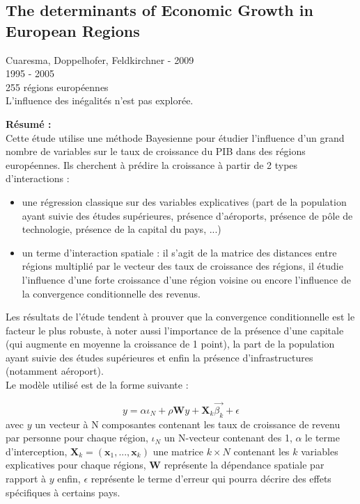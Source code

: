\documentclass[11pt,a4paper]{article}
\begin{document}
\subsection{The determinants of Economic Growth in European Regions}

Cuaresma, Doppelhofer, Feldkirchner - 2009 \\
1995 - 2005 \\
255 régions européennes \\
L'influence des inégalités n'est pas explorée. 

\noindent
\textbf{Résumé :} \\
Cette étude utilise une méthode Bayesienne pour étudier l'influence d'un grand nombre de variables sur le taux de croissance du PIB dans des régions européennes. Ils cherchent à prédire la croissance à partir de 2 types d'interactions :
\begin{itemize}
\item une régression classique sur des variables explicatives (part de la population ayant suivie des études supérieures, présence d'aéroports, présence de pôle de technologie, présence de la capital du pays, ...)
\item un terme d'interaction spatiale : il s'agit de la matrice des distances entre régions multiplié par le vecteur des taux de croissance des régions, il étudie l'influence d'une forte croissance d'une région voisine ou encore l'influence de la convergence conditionnelle des revenus. 
\end{itemize}
Les résultats de l'étude tendent à prouver que la convergence conditionnelle est le facteur le plus robuste, à noter aussi l'importance de la présence d'une capitale (qui augmente en moyenne la croissance de 1 point), la part de la population ayant suivie des études supérieures et enfin la présence d'infrastructures (notamment aéroport).\\

Le modèle utilisé est de la forme suivante : 

\begin{equation}
y = \alpha \iota_N + \rho \boldsymbol{W} y + \boldsymbol{X}_k \vec{\beta_k} + \epsilon
\end{equation}
avec $y$ un vecteur à N composantes contenant les taux de croissance de revenu par personne pour chaque région, $\iota_N$ un N-vecteur contenant des 1, $\alpha$ le terme d'interception, $\boldsymbol{X}_k = (\boldsymbol{x}_1, ..., \boldsymbol{x}_k)$ une matrice $k \times N$ contenant les $k$ variables explicatives pour chaque régions, $\boldsymbol{W}$ représente la dépendance spatiale par rapport à $y$ enfin, $\epsilon$ représente le terme d'erreur qui pourra décrire des effets spécifiques à certains pays. 
\end{document}
